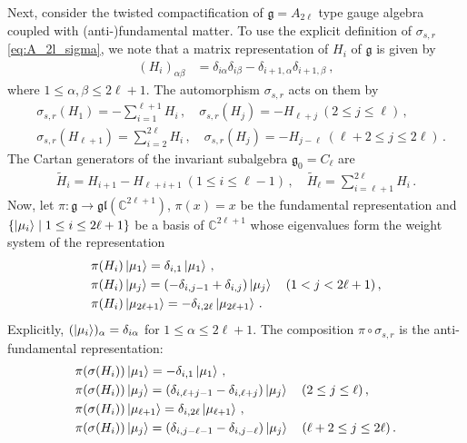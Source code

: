 Next, consider the twisted compactification of $ \mathfrak{g} = A_{2\ell} $ type gauge algebra coupled with (anti-)fundamental matter. To use the explicit definition of $ \sigma_{s,r} $ \eqref{eq:A_2l_sigma}, we note that a matrix representation of $ H_i $ of $ \mathfrak{g} $ is given by
\begin{align}
(H_i)_{\alpha \beta} &= \delta_{i \alpha} \delta_{i \beta} - \delta_{i+1,\alpha} \delta_{i+1,\beta}\ ,
\end{align}
where $ 1 \leq \alpha, \beta \leq 2\ell+1 $. The automorphism $ \sigma_{s,r} $ acts on them by
\begin{align}
&\sigma_{s,r}(H_1) = -\sum_{i=1}^{\ell+1} H_i \, , \quad
\sigma_{s,r}(H_j) = -H_{\ell+j} \ (2 \leq j \leq \ell) \, , \nonumber \\
&\sigma_{s,r}(H_{\ell+1}) = \sum_{i=2}^{2\ell} H_i \, , \quad
\sigma_{s,r}(H_j) = -H_{j-\ell} \ (\ell+2 \leq j \leq 2\ell) \, .
\end{align}
The Cartan generators of the invariant subalgebra $ \mathfrak{g}_0 = C_\ell $ are
\begin{align}
\tilde{H}_i = H_{i+1} - H_{\ell + i + 1} \ (1 \leq i \leq \ell-1)\, , \quad
\tilde{H}_\ell = \sum_{i = \ell+1}^{2\ell} H_i \, .
\end{align}
Now, let $ \pi : \mathfrak{g} \to \mathfrak{gl}(\mathbb{C}^{2\ell+1}) $, $ \pi(x) = x $ be the fundamental representation and $ \{\ket{\mu_i} \mid 1 \leq i \leq 2\ell+1 \} $ be a basis of $ \mathbb{C}^{2\ell+1} $ whose eigenvalues form  the weight system of the representation
\begin{align}\label{eq:su(2l+1)_fund_weight}
&\pi(H_i) \ket{\mu_1} = \delta_{i,1} \ket{\mu_1} \, ,  \nonumber \\
&\pi(H_i) \ket{\mu_j} = (-\delta_{i,j-1} + \delta_{i,j}) \ket{\mu_j} \quad (1 < j < 2\ell+1) \, ,\nonumber\\
&\pi(H_i) \ket{\mu_{2\ell+1}} = -\delta_{i,2\ell} \ket{\mu_{2\ell+1}} \, .
\end{align}
Explicitly, $ (\ket{\mu_i})_\alpha = \delta_{i\alpha} $ for $ 1 \leq \alpha \leq 2\ell+1 $. The composition $ \pi \circ \sigma_{s,r} $ is the anti-fundamental representation:
\begin{align}\label{eq:su(2l+1)_antifund_weight}
&\pi(\sigma(H_i)) \ket{\mu_1} = -\delta_{i,1} \ket{\mu_1} \, ,  \nonumber \\
&\pi(\sigma(H_i)) \ket{\mu_j} = (\delta_{i,\ell+j-1} - \delta_{i,\ell+j}) \ket{\mu_j} \quad (2 \leq j \leq \ell) \, , \nonumber \\
&
\pi(\sigma(H_i)) \ket{\mu_{\ell+1}} = \delta_{i,2\ell} \ket{\mu_{\ell+1}} \, , \nonumber\\
&\pi(\sigma(H_i)) \ket{\mu_{j}} = (\delta_{i,j-\ell-1} - \delta_{i,j-\ell}) \ket{\mu_{j}} \quad (\ell+2 \leq j \leq 2\ell) \, .
\end{align}
